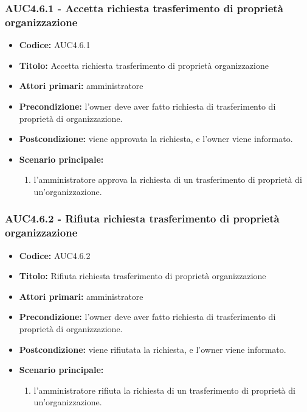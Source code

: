 \documentclass[casi-duso]{subfiles}
\begin{document}
\subsubsection{AUC4.6.1 - Accetta richiesta trasferimento di proprietà organizzazione}%
\label{subsub:AUC4.6.1}
\begin{itemize}
  \item \textbf{Codice:} AUC4.6.1
  \item \textbf{Titolo:} Accetta richiesta trasferimento di proprietà organizzazione
  \item \textbf{Attori primari:} amministratore
  \item \textbf{Precondizione:} l'owner deve aver fatto richiesta di trasferimento di proprietà di organizzazione.
  \item \textbf{Postcondizione:} viene approvata la richiesta, e l'owner viene informato.
  \item \textbf{Scenario principale:}
  \begin{enumerate}
    \item l'amministratore approva la richiesta di un trasferimento di proprietà di un'organizzazione.
  \end{enumerate}
\end{itemize}  

\subsubsection{AUC4.6.2 - Rifiuta richiesta trasferimento di proprietà organizzazione}%
\label{subsub:AUC4.6.2}
\begin{itemize}
  \item \textbf{Codice:} AUC4.6.2
  \item \textbf{Titolo:} Rifiuta richiesta trasferimento di proprietà organizzazione
  \item \textbf{Attori primari:} amministratore
  \item \textbf{Precondizione:} l'owner deve aver fatto richiesta di trasferimento di proprietà di organizzazione.
  \item \textbf{Postcondizione:} viene rifiutata la richiesta, e l'owner viene informato.
  \item \textbf{Scenario principale:}
  \begin{enumerate}
    \item  l'amministratore rifiuta la richiesta di un trasferimento di proprietà di un'organizzazione.
  \end{enumerate}
\end{itemize}
\end{document}

